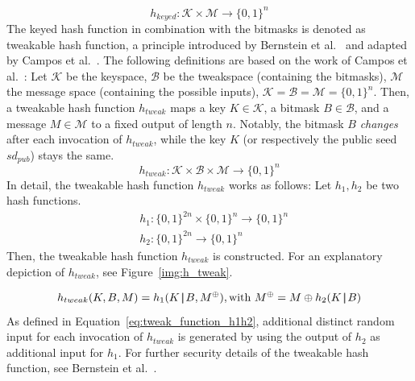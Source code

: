 \begin{equation}
\label{eq:keyed_hashfc_general}
h_{keyed}: \mathcal{K} \times \mathcal{M} \rightarrow \{0, 1 \}^n 
\end{equation}
The keyed hash function in combination with the bitmasks is denoted as tweakable hash function, a principle introduced by Bernstein et al.~\cite{tweakable_basispaper_sphincs_2019} and adapted by Campos et al.~\cite{fabio_paper_lms_vs_xmss}. The following definitions are based on the work of Campos et al.~\cite{fabio_paper_lms_vs_xmss}: 
Let $\mathcal{K}$ be the keyspace, $\mathcal{B}$ be the tweakspace (containing the bitmasks), $\mathcal{M}$ the message space (containing the possible inputs), $\mathcal{K}= \mathcal{B}=\mathcal{M}=\{0,1\}^n$.
Then, a tweakable hash function $h_{tweak}$ maps a key $K \in \mathcal{K}$, a bitmask $B \in \mathcal{B}$, and a message $M \in \mathcal{M}$ to a fixed output of length $n$. Notably, the bitmask $B$ \textit{changes} after each invocation of $h_{tweak}$, while the key $K$ (or respectively the public seed $sd_{pub}$) stays the same.
\begin{equation}
h_{tweak}: \mathcal{K} \times \mathcal{B} \times \mathcal{M} \rightarrow \{0,1\}^n
\end{equation}
In detail, the tweakable hash function $h_{tweak}$ works as follows: Let $h_1, h_2$ be two hash functions. %
\begin{align}
& h_1 : \{0,1\}^{2n} \times \{0,1\}^n \rightarrow \{0,1\}^n \\
& h_2 : \{0,1\}^{2n} \rightarrow \{0,1\}^n 
\end{align}
Then, the tweakable hash function $h_{tweak}$ is constructed. For an explanatory depiction of $h_{tweak}$, see Figure~\ref{img:h_tweak}.

\begin{equation}
\label{eq:tweak_function_h1h2}
h_{tweak}(K,B,M) = h_1(K \operatorname{|\!\!|} B , M^{\oplus}), \text{with } M^{\oplus}=M \oplus h_2(K \operatorname{|\!\!|} B)
\end{equation}
As defined in Equation~\ref{eq:tweak_function_h1h2}, additional distinct random input for each invocation of $h_{tweak}$ is generated by using the output of $h_2$ as additional input for $h_1$. For further security details of the tweakable hash function, see Bernstein et al.~\cite{tweakable_basispaper_sphincs_2019}. 

